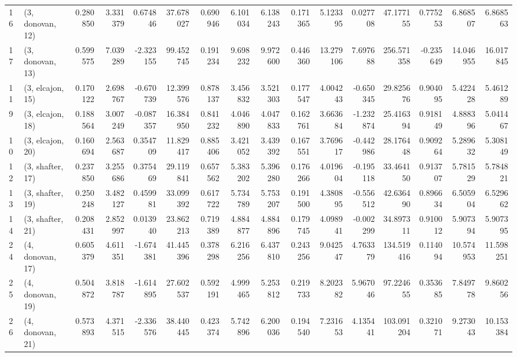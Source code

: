 \begin{tabular}{llrrrrrrrrrrrrrr}
16 &  (3, donovan, 12) &   0.280850 &  3.331379 &  0.674846 &   37.678027 &  0.690946 &   6.101034 &   6.138243 &  0.171365 &   5.123395 &  0.027708 &   47.177155 &  0.775253 &   6.868507 &   6.868563 \\
17 &  (3, donovan, 13) &   0.599575 &  7.039289 & -2.323155 &   99.452745 &  0.191234 &   9.698232 &   9.972600 &  0.446360 &  13.279106 &  7.697688 &  256.571358 & -0.235649 &  14.046955 &  16.017845 \\
11 &  (3, elcajon, 15) &   0.170122 &  2.698767 & -0.670739 &   12.399576 &  0.878137 &   3.456832 &   3.521303 &  0.177547 &   4.004243 & -0.650345 &   29.825676 &  0.904095 &   5.422428 &   5.461289 \\
9  &  (3, elcajon, 18) &   0.188564 &  3.007249 & -0.087357 &   16.384950 &  0.841232 &   4.046890 &   4.047833 &  0.162761 &   3.663684 & -1.232874 &   25.416394 &  0.918149 &   4.888396 &   5.041467 \\
10 &  (3, elcajon, 20) &   0.160694 &  2.563687 &  0.354709 &   11.829417 &  0.885406 &   3.421052 &   3.439392 &  0.167551 &   3.769617 & -0.442986 &   28.176448 &  0.909264 &   5.289632 &   5.308149 \\
12 &  (3, shafter, 17) &   0.237850 &  3.255686 &  0.375469 &   29.119841 &  0.657562 &   5.383202 &   5.396280 &  0.176266 &   4.019604 & -0.195118 &   33.464150 &  0.913707 &   5.781529 &   5.784821 \\
13 &  (3, shafter, 19) &   0.250248 &  3.482127 &  0.459981 &   33.099392 &  0.617722 &   5.734789 &   5.753207 &  0.191500 &   4.380895 & -0.556512 &   42.636490 &  0.896634 &   6.505904 &   6.529662 \\
14 &  (3, shafter, 21) &   0.208431 &  2.852997 &  0.013940 &   23.862213 &  0.719389 &   4.884877 &   4.884896 &  0.179745 &   4.098941 & -0.002299 &   34.897311 &  0.910012 &   5.907394 &   5.907395 \\
24 &  (4, donovan, 17) &   0.605379 &  4.611351 & -1.674381 &   41.445396 &  0.378298 &   6.216256 &   6.437810 &  0.243256 &   9.042547 &  4.763379 &  134.519416 &  0.114094 &  10.574953 &  11.598251 \\
25 &  (4, donovan, 19) &   0.504872 &  3.818787 & -1.614895 &   27.602537 &  0.592191 &   4.999465 &   5.253812 &  0.219733 &   8.202382 &  5.967046 &   97.224655 &  0.353685 &   7.849778 &   9.860256 \\
26 &  (4, donovan, 21) &   0.573893 &  4.371515 & -2.336576 &   38.440445 &  0.423374 &   5.742896 &   6.200036 &  0.194540 &   7.231653 &  4.135441 &  103.091204 &  0.321071 &   9.273043 &  10.153384 \\

\end{tabular}
